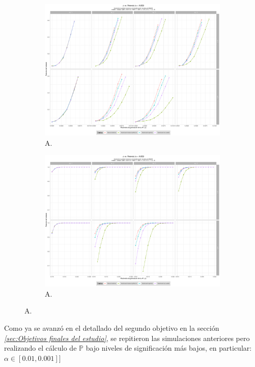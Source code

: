 \documentclass[IB,BIB]{TFUOC}%
\begin{document}
\begin{figure}[!htbp]
\hspace*{-2cm} %
\begin{subfigure}{.65\textwidth}
  \centering
  \includegraphics[width=.7\linewidth]{OBJ2SimplexMANTAqloc005ColaIzq.pdf}
  \caption{\scriptsize{A.}}
  \label{fig:OBJ2SimplexMANTAqloc005ColaIzq}
\end{subfigure}%
\begin{subfigure}{.65\textwidth}
\hspace*{-2.3cm} %
  \centering
  \includegraphics[width=.7\linewidth]{OBJ2SimplexMANTAqloc005Coladch.pdf}
  \caption{\scriptsize{A.}}
  \label{fig:OBJ2SimplexMANTAqloc005Coladch}
\end{subfigure}
\caption{\scriptsize{A.}}
\label{fig:OBJ2005zoom}
\end{figure}

Como ya se avanzó en el detallado del segundo objetivo en la sección \textit{\ref{sec:Objetivos finales del estudio}}, se repitieron las simulaciones anteriores pero realizando el cálculo de \( \mathbb P \) bajo niveles de significación más bajos, en particular: \( \alpha \in [\text{0.01}, \text{0.001}]] \)
\end{document}
